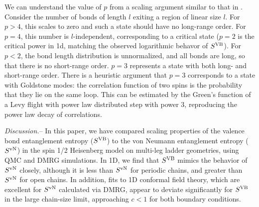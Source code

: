 \documentclass[prl,aps,twocolumn,floatfix,amsmath,amssymb,superscriptaddress,tightenlines]{revtex4}
\begin{document}
We can understand the value of $p$ from a scaling argument similar to that in \cite{network}.
Consider the number of bonds of length $l$ exiting a region of linear size $l$.  For $p>4$, this
scales to zero and such a state should have no long-range order.
For $p=4$, this number is $l$-independent, corresponding to a critical
state ($p=2$ is the critical power in 1d, matching the
observed logarithmic behavor of $S^{\rm VB}$).
For $p<2$, the bond length distribution is unnormalized, and all bonds are long, so that
there is no short-range order.  $p=3$ represents a state with both long-
and short-range order.  There is a heuristic argument that $p=3$ corresponds to a state
with Goldstone modes: the correlation function of two spins is the
probability that they lie on the same loop.  This can be
estimated by
the Green's function of a Levy flight with power law distributed step with power $3$,
reproducing the power law decay of correlations.



{\it Discussion.}-- In this paper, we have compared scaling properties of
the valence bond entanglement entropy ($S^{\rm VB}$) \cite{Alet,Chh} to the von Neumann entanglement entropy ($S^{ \rm vN}$) in the
spin 1/2 Heisenberg model on multi-leg ladder geometries, using QMC and DMRG simulations.
In 1D, we find
that $S^{\rm VB}$ mimics the behavior of $S^{ \rm vN}$ closely, although 
it is less than $S^{ \rm vN}$ for periodic
chains, and greater than $S^{ \rm vN}$ for open chains. In addition, fits to
1D conformal field theory, which are excellent for $S^{ \rm vN}$ calculated
via DMRG, appear to deviate significantly for $S^{\rm VB}$ in the large
chain-size limit, approaching $c<1$ for both boundary conditions.

\end{document}
